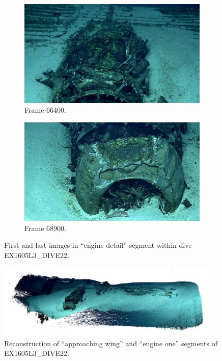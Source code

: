 \documentclass[letterpaper,12pt]{article}
\begin{document}
\begin{figure}[p]
    \centering
    \begin{subfigure}[b]{0.48\textwidth}
        \includegraphics[width=\textwidth]{images/image_066400.png}
        \caption{Frame 66400.}
        \label{fig:ex1605l3_dive22_engine_detail_begin}
    \end{subfigure}
    \begin{subfigure}[b]{0.48\textwidth}
        \includegraphics[width=\textwidth]{images/image_068900.png}
        \caption{Frame 68900.}
        \label{fig:ex1605l3_dive22_engine_detail_end}
    \end{subfigure}
    \caption{First and last images in ``engine detail'' segment within dive EX1605L3\_DIVE22.}
\end{figure}


\begin{figure}
    \centering
    \includegraphics[width=0.95\textwidth]{images/approaching_wing_photoscan.png}
    \caption{Reconstruction of ``approaching wing'' and ``engine one'' segments of EX1605L3\_DIVE22.}
    \label{fig:ex1605l3_dive22_wing_photoscan}
\end{figure}
\end{document}
